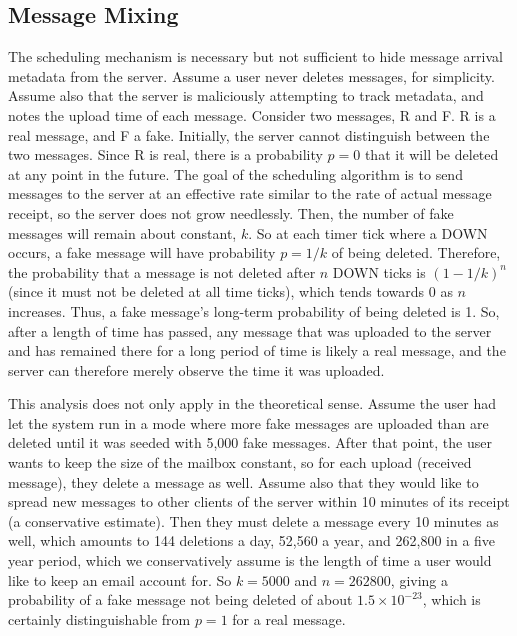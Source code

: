 \documentclass[pageno]{jpaper}
\begin{document}

\label{mixing}
\subsection{Message Mixing}
The scheduling mechanism is necessary but not sufficient to hide message arrival metadata from the server. Assume a user never deletes messages, for simplicity. Assume also that the server is maliciously attempting to track metadata, and notes the upload time of each message. Consider two messages, R and F. R is a real message, and F a fake. Initially, the server cannot distinguish between the two messages. Since R is real, there is a probability $p=0$ that it will be deleted at any point in the future. The goal of the scheduling algorithm is to send messages to the server at an effective rate similar to the rate of actual message receipt, so the server does not grow needlessly. Then, the number of fake messages will remain about constant, $k$. So at each timer tick where a DOWN occurs, a fake message will have probability $p=1/k$ of being deleted. Therefore, the probability that a message is not deleted after $n$ DOWN ticks is $(1-1/k)^n$ (since it must not be deleted at all time ticks), which tends towards 0 as $n$ increases. Thus, a fake message's long-term probability of being deleted is 1. So, after a length of time has passed, any message that was uploaded to the server and has remained there for a long period of time is likely a real message, and the server can therefore merely observe the time it was uploaded.

This analysis does not only apply in the theoretical sense. Assume the user had let the system run in a mode where more fake messages are uploaded than are deleted until it was seeded with 5,000 fake messages. After that point, the user wants to keep the size of the mailbox constant, so for each upload (received message), they delete a message as well. Assume also that they would like to spread new messages to other clients of the server within 10 minutes of its receipt (a conservative estimate). Then they must delete a message every 10 minutes as well, which amounts to 144 deletions a day, 52,560 a year, and 262,800 in a five year period, which we conservatively assume is the length of time a user would like to keep an email account for. So $k=5000$ and $n=262800$, giving a probability of a fake message not being deleted of about $1.5\times10^{-23}$, which is certainly distinguishable from $p=1$ for a real message.
\end{document}
